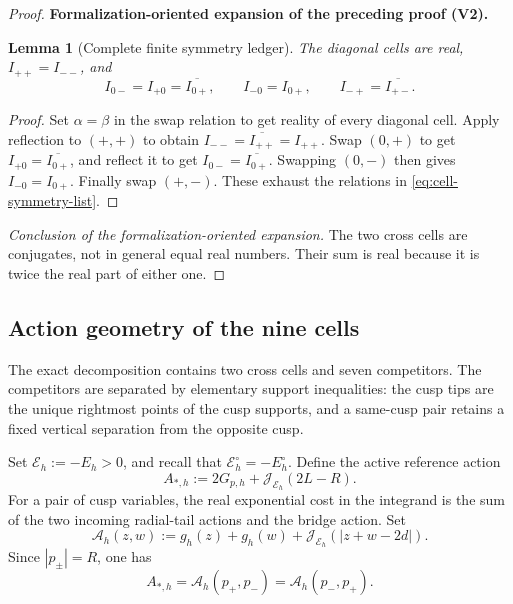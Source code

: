 \documentclass[11pt]{article}
\newtheorem{lemma}[theorem]{Lemma}
\newcommand{\formalisationparentid}{X}
\newenvironment{formalisationaddition}[1]{\par\medskip\begingroup\color{blue}\def\formalisationparentid{#1}\setcounter{formalizationsublemma}{0}\let\lemma\formalizationsublemma\let\endlemma\endformalizationsublemma
  \def\Eo{\mathcal E_h^\circ}\def\EE{\mathcal E_h}\def\phio{\phi_h^\circ}\def\phih{\phi_h}\def\Ho{H_h^{\rm atom}(v^\circ)}\def\Ha{H_h^{\rm atom}}\def\HL{H_h^{L}}\def\Dh{D_h}\def\Log{\operatorname{Log}}\def\ellh{\ell_h}\def\Gp{G_{p,h}}\def\Ast{A_{*,h}}\def\ahat{\widehat{\mathfrak a}_h}\def\ah{\mathfrak a_h}\def\rh{\widehat\rho_h}\def\deltah{\widehat\delta_h}\def\oldref##1{\textup{(##1)}}\def\interface##1{\par\noindent\textit{Analytical interface used here.} ##1\par}\def\finish{\par\noindent\textit{Conclusion of the formalization-oriented expansion.} }\par\noindent\textbf{Formalization-oriented expansion of the preceding proof (V2).}\par\smallskip
}{\par\endgroup\medskip
}
\newcommand{\cA}{\mathcal A}
\newcommand{\cE}{\mathcal E}
\newcommand{\cJ}{\mathcal J}
\begin{document}
\begin{proof}
\begin{formalisationaddition}{L5.3}
\begin{lemma}[Complete finite symmetry ledger]\label{sublemma:L5-3-ledger}
The diagonal cells are real, $I_{++}=I_{--}$, and
\[
 I_{0-}=I_{+0}=\overline{I_{0+}},\qquad
 I_{-0}=I_{0+},\qquad I_{-+}=\overline{I_{+-}}.
\]
\end{lemma}
\begin{proof}
Set $\alpha=\beta$ in the swap relation to get reality of every diagonal cell. Apply reflection to $(+,+)$ to obtain $I_{--}=\overline{I_{++}}=I_{++}$. Swap $(0,+)$ to get $I_{+0}=\overline{I_{0+}}$, and reflect it to get $I_{0-}=\overline{I_{0+}}$. Swapping $(0,-)$ then gives $I_{-0}=I_{0+}$. Finally swap $(+,-)$. These exhaust the relations in \eqref{eq:cell-symmetry-list}.
\end{proof}
\finish The two cross cells are conjugates, not in general equal real numbers. Their sum is real because it is twice the real part of either one.
\end{formalisationaddition}

\end{proof}

\subsection{Action geometry of the nine cells}
The exact decomposition  contains two cross cells
and seven competitors.  The competitors are separated by elementary support
inequalities: the cusp tips are the unique rightmost points of the cusp
supports, and a same-cusp pair retains a fixed vertical separation from the
opposite cusp.

Set $\cE_h:=-E_h>0$, and recall that
$\cE_h^\circ=-E_h^\circ$.
Define the active reference action
\begin{equation}\label{eq:active-reference-action}
 A_{*,h}:=2G_{p,h}+\cJ_{\cE_h}(2L-R).
\end{equation}
For a pair of cusp variables, the real exponential cost in the integrand is
the sum of the two incoming radial-tail actions and the bridge action.  Set
\begin{equation}\label{eq:cusp-full-action}
 \cA_h(z,w):=g_h(z)+g_h(w)+\cJ_{\cE_h}(|z+w-2d|).
\end{equation}
Since $|p_\pm|=R$, one has
\[
 A_{*,h}=\cA_h(p_+,p_-)=\cA_h(p_-,p_+).
\]
\end{document}
